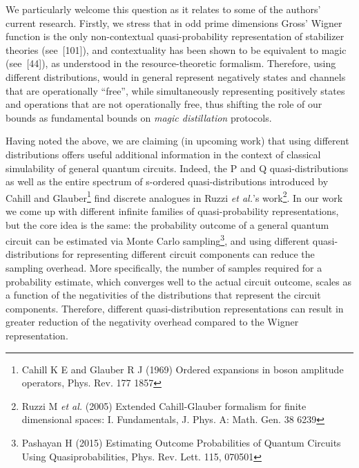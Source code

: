 \documentclass[11pt]{letter}
\begin{document}
We particularly welcome this question as it relates to some of the authors' current research.
Firstly, we stress that in odd prime dimensions Gross' Wigner function is the only non-contextual quasi-probability representation of stabilizer theories (see~[101]), and contextuality has been shown to be equivalent to magic (see~[44]), as understood in the resource-theoretic formalism.
Therefore, using different distributions, would in general represent negatively states and channels that are operationally ``free'', while simultaneously representing positively states and operations that are not operationally free, thus shifting the role of our bounds as fundamental bounds on \emph{magic distillation} protocols.

Having noted the above, we are claiming (in upcoming work) that using different distributions offers useful additional information in the context of classical simulability of general quantum circuits.
Indeed, the P and Q quasi-distributions as well as the entire spectrum of s-ordered quasi-distributions introduced by Cahill and Glauber\footnote{Cahill K E and Glauber R J (1969) Ordered expansions in boson amplitude operators, Phys. Rev. 177 1857} find discrete analogues in Ruzzi \textit{et al.}'s work\footnote{Ruzzi M \textit{et al.} (2005) Extended Cahill-Glauber formalism for finite dimensional spaces: I. Fundamentals, J. Phys. A: Math. Gen. 38 6239}.
In our work we come up with different infinite families of quasi-probability representations, but the core idea is the same: the probability outcome of a general quantum circuit can be estimated via Monte Carlo sampling\footnote{Pashayan H (2015) Estimating Outcome Probabilities of Quantum Circuits Using Quasiprobabilities, Phys. Rev. Lett. 115, 070501}, and using different quasi-distributions for representing different circuit components can reduce the sampling overhead.
More specifically, the number of samples required for a probability estimate, which converges well to the actual circuit outcome, scales as a function of the negativities of the distributions that represent the circuit components. Therefore, different quasi-distribution representations can result in greater reduction of the negativity overhead compared to the Wigner representation.
\end{document}
